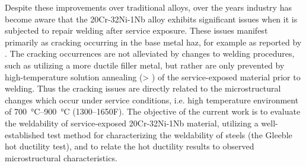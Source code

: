 Despite these improvements over traditional alloys, over the years industry has become aware \cite{api_942_2014} that the 20Cr-32Ni-1Nb alloy exhibits significant issues when it is subjected to repair welding after service exposure. These issues manifest primarily as cracking occurring in the base metal \gls{haz}, for example as reported by \citet{hoffman_weld_1998}. The cracking occurrences are not alleviated by changes to welding procedures, such as utilizing a more ductile filler metal, but rather are only prevented by high-temperature solution annealing (> ) of the service-exposed material prior to welding. Thus the cracking issues are directly related to the microstructural changes which occur under service conditions, i.e. high temperature environment of \SIrange[range-phrase=--]{700}{900}{\degreeCelsius} (\numrange[range-phrase=--]{1300}{1650}\textdegree{}F). The objective of the current work is to evaluate the weldability of service-exposed 20Cr-32Ni-1Nb material, utilizing a well-established test method for characterizing the weldability of steels (the Gleeble hot ductility test), and to relate the hot ductility results to observed microstructural characteristics.












